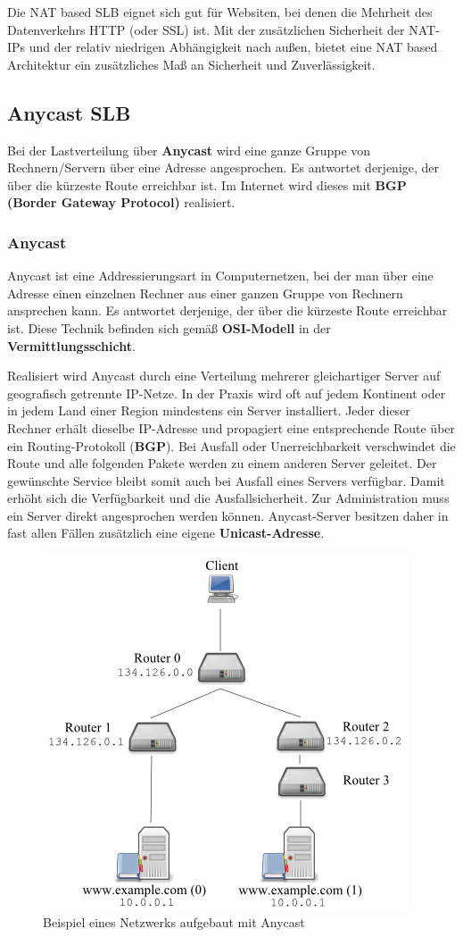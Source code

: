 Die NAT based SLB eignet sich gut für Websiten, bei denen die Mehrheit des Datenverkehrs HTTP (oder SSL) ist. Mit der zusätzlichen Sicherheit der NAT-IPs und der relativ niedrigen Abhängigkeit nach außen, bietet eine NAT based Architektur ein zusätzliches Maß an Sicherheit und Zuverlässigkeit.
\newpage


\subsection{Anycast SLB}\cite{AS}
\label{anySLB}
Bei der Lastverteilung über \textbf{Anycast} wird eine ganze Gruppe von Rechnern/Servern über eine Adresse angesprochen. Es antwortet derjenige, der über die kürzeste Route erreichbar ist. Im Internet wird dieses mit \textbf{BGP (Border Gateway Protocol)} realisiert.

\subsubsection{Anycast}\cite{anycast}
Anycast ist eine Addressierungsart in Computernetzen, bei der man über eine Adresse einen einzelnen Rechner aus einer ganzen Gruppe von Rechnern ansprechen kann. Es antwortet derjenige, der über die kürzeste Route erreichbar ist. Diese Technik befinden sich gemäß \textbf{OSI-Modell} in der \textbf{Vermittlungsschicht}.

Realisiert wird Anycast durch eine Verteilung mehrerer gleichartiger Server auf geografisch getrennte IP-Netze. In der Praxis wird oft auf jedem Kontinent oder in jedem Land einer Region mindestens ein Server installiert. Jeder dieser Rechner erhält dieselbe IP-Adresse und propagiert eine entsprechende Route über ein Routing-Protokoll (\textbf{BGP}). Bei Ausfall oder Unerreichbarkeit verschwindet die Route und alle folgenden Pakete werden zu einem anderen Server geleitet. Der gewünschte Service bleibt somit auch bei Ausfall eines Servers verfügbar. Damit erhöht sich die Verfügbarkeit und die Ausfallsicherheit. Zur Administration muss ein Server direkt angesprochen werden können. Anycast-Server besitzen daher in fast allen Fällen zusätzlich eine eigene \textbf{Unicast-Adresse}.

\begin{figure}[!h]
	\begin{center}
		\includegraphics[width=0.5\linewidth]{images/anycast_slb}
		\caption{Beispiel eines Netzwerks aufgebaut mit Anycast}
		\label{anycast_slb_01}
	\end{center}
\end{figure}
